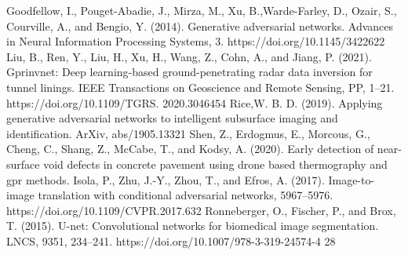 \documentclass[conference]{IEEEtran}
\begin{document}
\begin{thebibliography}{00}
 Goodfellow, I., Pouget-Abadie, J., Mirza, M., Xu, B.,Warde-Farley, D., Ozair, S., Courville, A., and Bengio, Y. (2014). Generative adversarial networks. Advances in Neural Information Processing Systems, 3. https://doi.org/10.1145/3422622
 Liu, B., Ren, Y., Liu, H., Xu, H., Wang, Z., Cohn, A., and Jiang, P. (2021). Gprinvnet: Deep learning-based ground-penetrating radar data inversion for tunnel linings. IEEE Transactions on Geoscience and Remote Sensing, PP, 1–21. https://doi.org/10.1109/TGRS. 2020.3046454
 Rice,W. B. D. (2019). Applying generative adversarial networks to intelligent subsurface imaging and identification. ArXiv, abs/1905.13321
 Shen, Z., Erdogmus, E., Morcous, G., Cheng, C., Shang, Z., McCabe, T., and Kodsy, A. (2020). Early detection of near-surface void defects in concrete pavement using drone based thermography and gpr methods.
 Isola, P., Zhu, J.-Y., Zhou, T., and Efros, A. (2017). Image-to-image translation with conditional adversarial networks, 5967–5976. https://doi.org/10.1109/CVPR.2017.632
 Ronneberger, O., Fischer, P., and Brox, T. (2015). U-net: Convolutional networks for biomedical image segmentation. LNCS, 9351, 234–241. https://doi.org/10.1007/978-3-319-24574-4 28
\end{thebibliography}
\end{document}
